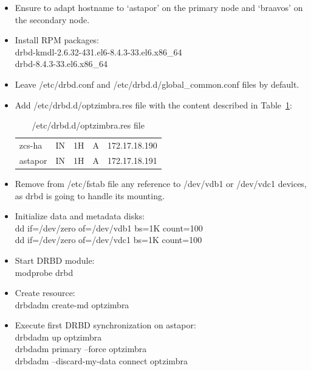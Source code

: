 \documentclass[a4paper, 12pt]{book}
\begin{document}
\begin{itemize}
	\item Ensure to adapt hostname to `astapor' on the primary node and `braavos' on the secondary node.
	
	\item Install RPM packages:\\
			drbd-kmdl-2.6.32-431.el6-8.4.3-33.el6.x86\_64\\
			drbd-8.4.3-33.el6.x86\_64
	
	\item Leave /etc/drbd.conf and /etc/drbd.d/global\_common.conf files by default.
	
	\item Add /etc/drbd.d/optzimbra.res file with the content described in Table~\ref{table:resource}:

\FloatBarrier
\begin{table}[H]
  \centering
  \begin{tabular}{ | l l l l l | }
    \hline
      zcs-ha          & IN & 1H & A     & 172.17.18.190\\
      astapor         & IN & 1H & A     & 172.17.18.191\\
    \hline
  \end{tabular}
\caption{/etc/drbd.d/optzimbra.res file}
\label{table:resource}
\end{table}
	
	\item Remove from /etc/fstab file any reference to /dev/vdb1 or /dev/vdc1 devices, as drbd is going to handle its mounting.
	
	\item Initialize data and metadata disks:\\
		\indent dd if=/dev/zero of=/dev/vdb1 bs=1K count=100\\
		\indent dd if=/dev/zero of=/dev/vdc1 bs=1K count=100
	
	\item Start DRBD module:\\
		modprobe drbd
	
	\item Create resource:\\
		drbdadm create-md optzimbra
	
	\item Execute first DRBD synchronization on astapor:\\
		drbdadm up optzimbra\\
		drbdadm primary --force optzimbra\\
		drbdadm --discard-my-data connect optzimbra


\end{itemize}
\end{document}

